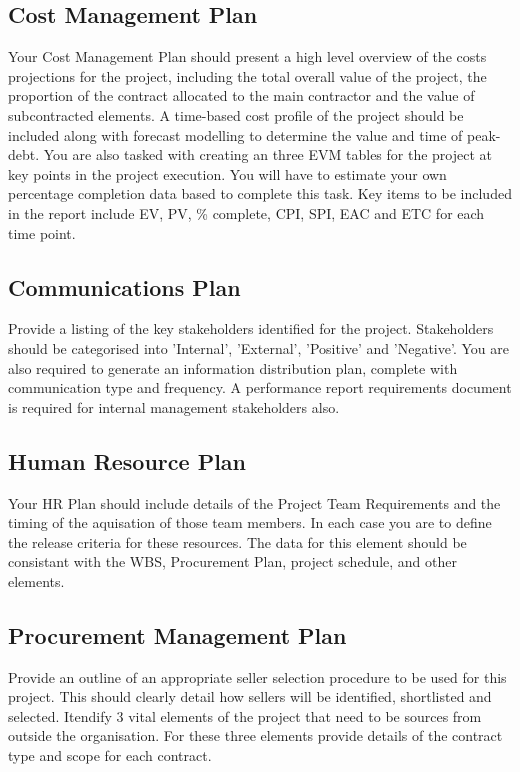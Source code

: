\subsection{Cost Management Plan}
Your Cost Management Plan should present a high level overview of the costs projections for the project, including the total overall value of the project, the proportion of the contract allocated to the main contractor and the value of subcontracted elements.  A time-based cost profile of the project should be included along with forecast modelling to determine the value and time of peak-debt.  You are also tasked with creating an three EVM tables for the project at key points in the project execution.  You will have to estimate your own percentage completion data based to complete this task.  Key items to be included in the report include EV, PV, \% complete, CPI, SPI, EAC and ETC for each time point.

\subsection{Communications Plan}

Provide a listing of the key stakeholders identified for the project.  Stakeholders should be categorised into 'Internal', 'External', 'Positive' and 'Negative'.  You are also required to generate an information distribution plan, complete with communication type and frequency.  A performance report requirements document is required for internal management stakeholders also.

\subsection{Human Resource Plan}

Your HR Plan should include details of the Project Team Requirements and the timing of the aquisation of those team members.  In each case you are to define the release criteria for these resources.  The data for this element should be consistant with the WBS, Procurement Plan, project schedule, and other elements.

\subsection{Procurement Management Plan} 

Provide an outline of an appropriate seller selection procedure to be used for this project.  This should clearly detail how sellers will be identified, shortlisted and selected.  Itendify 3 vital elements of the project that need to be sources from outside the organisation.  For these three elements provide details of the contract type and scope for each contract.

